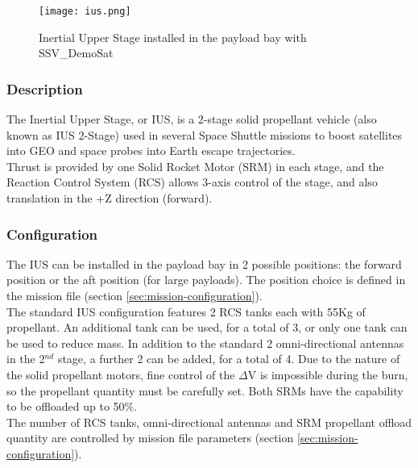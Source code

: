 \documentclass[Space_Shuttle_Vessel_Manual.tex]{subfiles}
\begin{document}
\begin{multicols*}{2}
\renewcommand{\cfttoctitlefont}{\bf}
\localtableofcontents

\begin{figure}[H]
	\centering
	\captionsetup{justification=centering}
  \texttt{[image: ius.png]}
  \caption{Inertial Upper Stage installed in the payload bay with SSV\_DemoSat}
  \label{fig:ius}
\end{figure}

\subsubsection{Description}
\noindent
The Inertial Upper Stage, or IUS, is a 2-stage solid propellant vehicle (also known as IUS 2-Stage) used in several Space Shuttle missions to boost satellites into GEO and space probes into Earth escape trajectories.\\
Thrust is provided by one Solid Rocket Motor (SRM) in each stage, and the Reaction Control System (RCS) allows 3-axis control of the stage, and also translation in the +Z direction (forward).\\

\subsubsection{Configuration}
\noindent
The IUS can be installed in the payload bay in 2 possible positions: the forward position or the aft position (for large payloads). The position choice is defined in the mission file (section \ref{sec:mission-configuration}).\\
The standard IUS configuration features 2 RCS tanks each with 55Kg of propellant. An additional tank can be used, for a total of 3, or only one tank can be used to reduce mass. In addition to the standard 2 omni-directional antennas in the 2$^{nd}$ stage, a further 2 can be added, for a total of 4. Due to the nature of the solid propellant motors, fine control of the $\Delta$V is impossible during the burn, so the propellant quantity must be carefully set. Both SRMs have the capability to be offloaded up to 50\%.\\
The number of RCS tanks, omni-directional antennas and SRM propellant offload quantity are controlled by mission file parameters (section \ref{sec:mission-configuration}).


\end{multicols*}
\end{document}
